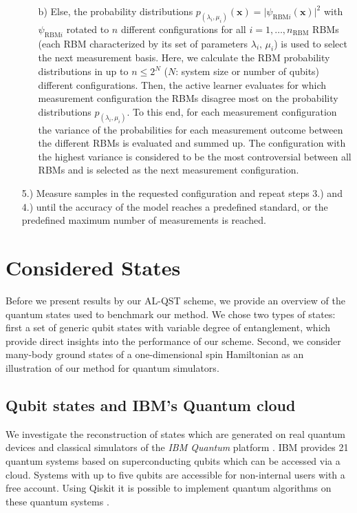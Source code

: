 \documentclass[pra,aps,showpacs,groupedaddress,superscriptaddress,twocolumn,toc=flat,biblatex,footinbib]{revtex4-1}
\renewcommand{\vec}[1]{\bm{#1}}
\begin{document}
\begin{itemize}
\begin{itemize}
        \item [b)] Else, the probability distributions $p_{(\lambda_i, \mu_i)}(\vec{x})=\vert \psi_{\mathrm{RBM}i}(\vec{x})\vert ^2$ with $\psi_{\mathrm{RBM}i}$ rotated to $n$ different configurations for all $i = 1, \dots, n_{\mathrm{RBM}}$ RBMs (each RBM characterized by its set of parameters $\lambda_i, \, \mu_i $) is used to select the next measurement basis. Here, we calculate the RBM probability distributions in up to $n\leq 2^N$ ($N$: system size or number of qubits) different configurations. Then, the active learner evaluates for which measurement configuration the RBMs disagree most on the probability distributions $p_{(\lambda_i, \mu_i)}$. To this end, for each measurement configuration the variance of the probabilities for each measurement outcome between the different RBMs is evaluated and summed up. The configuration with the highest variance is considered to be the most controversial between all RBMs and is selected as the next measurement configuration.
    \end{itemize} 
    \item[5.)] Measure samples in the requested configuration and repeat steps 3.) and 4.) until the accuracy of the model reaches a predefined standard, or the predefined maximum number of measurements is reached.
\end{itemize}


\section{Considered States \label{sec:States}}
Before we present results by our AL-QST scheme, we provide an overview of the quantum states used to benchmark our method. We chose two types of states: first a set of generic qubit states with variable degree of entanglement, which provide direct insights into the performance of our scheme. Second, we consider many-body ground states of a one-dimensional spin Hamiltonian as an illustration of our method for quantum simulators. 

\subsection{Qubit states and IBM's Quantum cloud}

We investigate the reconstruction of states which are generated on real quantum devices and classical simulators of the \textit{IBM Quantum} platform \cite{IBM}. IBM provides 21 quantum systems based on superconducting qubits which can be accessed via a cloud. Systems with up to five qubits are accessible for non-internal users with a free account. Using Qiskit it is possible to implement quantum algorithms on these quantum systems \cite{Qiskit2010}.
\end{document}

